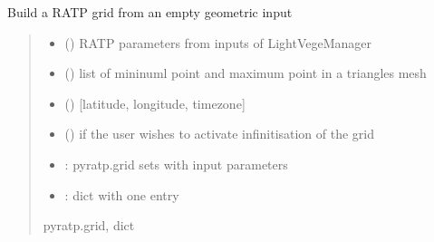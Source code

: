 \documentclass[letterpaper,10pt,english]{sphinxmanual}
\begin{document}
\begin{fulllineitems}
\label{\detokenize{reference:buildRATPscene.build_RATPscene_empty}}
\pysigstartsignatures
{}
\pysigstopsignatures
\sphinxAtStartPar
Build a RATP grid from an empty geometric input
\begin{quote}\begin{description}
\begin{itemize}
\item {} 
\sphinxAtStartPar
{} () \textendash{} RATP parameters from inputs of LightVegeManager

\item {} 
\sphinxAtStartPar
{} (\sphinxstyleliteralemphasis{\sphinxupquote{{[}}}\sphinxstyleliteralemphasis{\sphinxupquote{, }}\sphinxstyleliteralemphasis{\sphinxupquote{{]}}}) \textendash{} list of mininuml point and maximum point in a triangles mesh

\item {} 
\sphinxAtStartPar
{} () \textendash{} {[}latitude, longitude, timezone{]}

\item {} 
\sphinxAtStartPar
{} () \textendash{} if the user wishes to activate infinitisation of the grid

\end{itemize}

\sphinxAtStartPar
\begin{itemize}
\item {} 
\sphinxAtStartPar
{}: pyratp.grid sets with input parameters

\item {} 
\sphinxAtStartPar
{}: dict with one entry 

\end{itemize}


\sphinxAtStartPar
pyratp.grid, dict

\end{description}\end{quote}

\end{fulllineitems}
\end{document}

